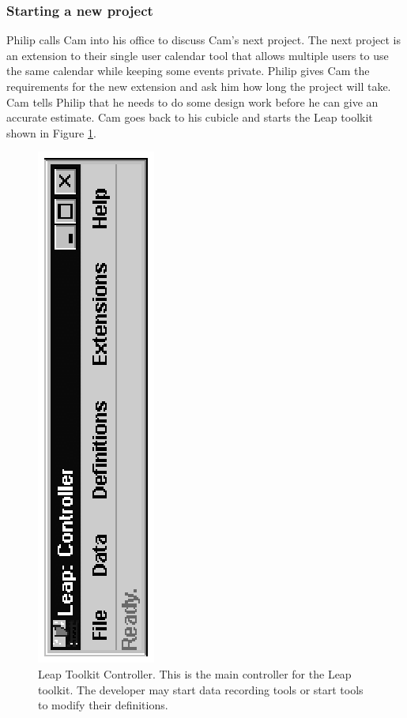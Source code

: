 \subsubsection*{Starting a new project} 
Philip calls Cam into his office to discuss Cam's next project.  The next
project is an extension to their single user calendar tool that allows multiple
users to use the same calendar while keeping some events private.  Philip gives
Cam the requirements for the new extension and ask him how long the project
will take.  Cam tells Philip that he needs to do some design work before he can
give an accurate estimate.  Cam goes back to his cubicle and starts the Leap
toolkit shown in Figure \ref{fig:LeapController}.
\begin{figure}[p]
  \centering
  \includegraphics[angle=270,bb=195 280 250 510]{LeapController.eps}
  \caption{Leap Toolkit Controller. This is the main controller for the Leap
  toolkit. The developer may start data recording tools or start tools to
  modify their definitions.}
  \label{fig:LeapController}
\end{figure}

